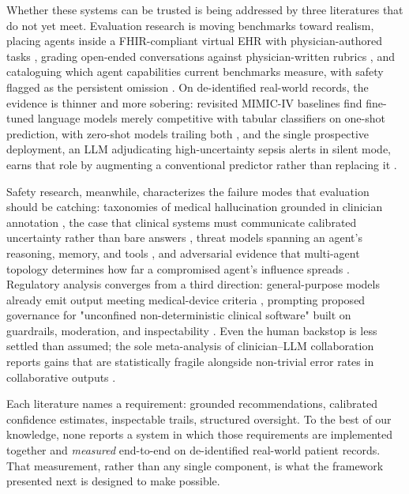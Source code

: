 Whether these systems can be trusted is being addressed by three literatures that do not yet
meet. Evaluation research is moving benchmarks toward realism, placing agents inside a
FHIR-compliant virtual EHR with physician-authored tasks \cite{jiang2025medagentbench}, grading
open-ended conversations against physician-written rubrics \cite{arora2025healthbench}, and
cataloguing which agent capabilities current benchmarks measure, with safety flagged as the
persistent omission \cite{yehudai2025evaluation}. On de-identified real-world records, the evidence is thinner and
more sobering: revisited MIMIC-IV baselines find fine-tuned language models merely
competitive with tabular classifiers on one-shot prediction, with zero-shot models trailing
both \cite{lovon2025mimic}, and the single prospective deployment, an LLM adjudicating
high-uncertainty sepsis alerts in silent mode, earns that role by augmenting a conventional
predictor rather than replacing it \cite{shashikumar2025sepsis}.

Safety research, meanwhile, characterizes the failure modes that evaluation should be
catching: taxonomies of medical hallucination grounded in clinician annotation
\cite{kim2025hallucinations}, the case that clinical systems must communicate calibrated
uncertainty rather than bare answers \cite{atf2025uncertainty}, threat models spanning an agent's
reasoning, memory, and tools \cite{yu2025trustagent}, and adversarial evidence that multi-agent
topology determines how far a compromised agent's influence spreads \cite{chen2025medsentry}.
Regulatory analysis converges from a third direction: general-purpose models already emit
output meeting medical-device criteria \cite{weissman2025unregulated}, prompting proposed
governance for "unconfined non-deterministic clinical software" built on guardrails,
moderation, and inspectability \cite{tan2026undcs}. Even the human backstop is less settled than
assumed; the sole meta-analysis of clinician--LLM collaboration reports gains that are
statistically fragile alongside non-trivial error rates in collaborative outputs
\cite{wang2026collaboration}.

Each literature names a requirement: grounded recommendations, calibrated confidence
estimates, inspectable trails, structured oversight. To the best of our knowledge, none reports a
system in which those requirements are implemented together and \emph{measured} end-to-end on
de-identified real-world patient records. That
measurement, rather than any single component, is what the framework presented next is
designed to make possible.



